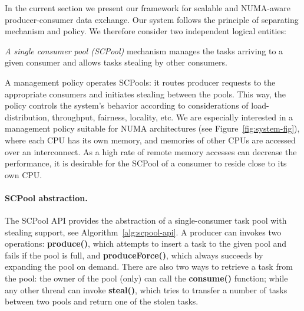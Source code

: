 \negspace
In the current section we present our framework for scalable and NUMA-aware producer-consumer data exchange. 
Our system follows the principle of separating mechanism and policy.
We therefore consider two independent logical entities: 
\snegspace
\begin{enum*}
	\item \emph{A single consumer pool (SCPool)} mechanism manages the tasks arriving to a given consumer and allows tasks stealing by other consumers.
	\item A management policy operates SCPools: it routes producer requests to the appropriate consumers and initiates stealing between the pools. This way, the policy controls the system's behavior according to considerations of load-distribution, throughput, fairness, locality, etc.
	We are especially interested in a management policy suitable for NUMA architectures (see Figure~\ref{fig:system-fig}), where each CPU has its own memory, and memories of other CPUs are accessed over an interconnect. As a high rate of remote memory accesses can decrease the performance, it is desirable for the SCPool of a consumer to reside close to its own CPU. 
\end{enum*} 

\negspace
\paragraph{SCPool abstraction.}

The SCPool API provides the abstraction of a single-consumer task pool with stealing support, see Algorithm~\ref{alg:scpool-api}.
A producer can invokes two operations: {\bf produce()}, which attempts to insert a task to the given pool and fails if the pool is full, and {\bf produceForce()}, which always succeeds by expanding the pool on demand.
There are also two ways to retrieve a task from the pool: the owner of the pool (only) can call the {\bf consume()} function; while any other thread can invoke {\bf steal()}, which tries to transfer a number of tasks between two pools and return one of the stolen tasks. 

